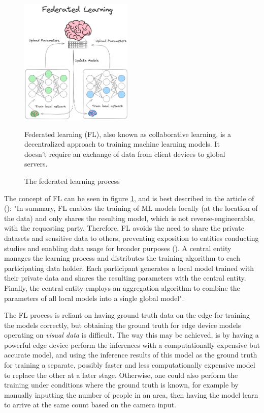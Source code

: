 \begin{figure}
    \centering
    \includegraphics[width=0.48\textwidth]{Images/Diagrams/FL_updated.png}
    \caption{The federated learning process}
    \label{fig:federatedlearning}

    Federated learning (FL), also known as collaborative learning, is a decentralized approach to training machine learning models. It doesn't require an exchange of data from client devices to global servers.
\end{figure}

The concept of FL can be seen in figure \ref{fig:federatedlearning}, and is best described in the article of \citeauthor{an2022federatedlearninghealthcare} (\citeyear{an2022federatedlearninghealthcare}): "In summary, FL enables the training of ML models locally (at the location of the data) and only shares the resulting model, which is not reverse-engineerable, with the requesting party. Therefore, FL avoids the need to share the private datasets and sensitive data to others, preventing exposition to entities conducting studies and enabling data usage for broader purposes (\cite{re2021servertoclientml}). A central entity manages the learning process and distributes the training algorithm to each participating data holder. Each participant generates a local model trained with their private data and shares the resulting parameters with the central entity. Finally, the central entity employs an aggregation algorithm to combine the parameters of all local models into a single global model".


The FL process is reliant on having ground truth data on the edge for training the models correctly, but obtaining the ground truth for edge device models operating on \textit{visual data} is difficult. The way this may be achieved, is by having a powerful edge device perform the inferences with a computationally expensive but accurate model, and using the inference results of this model as the ground truth for training a separate, possibly faster and less computationally expensive model to replace the other at a later stage. Otherwise, one could also perform the training under conditions where the ground truth is known, for example by manually inputting the number of people in an area, then having the model learn to arrive at the same count based on the camera input.

